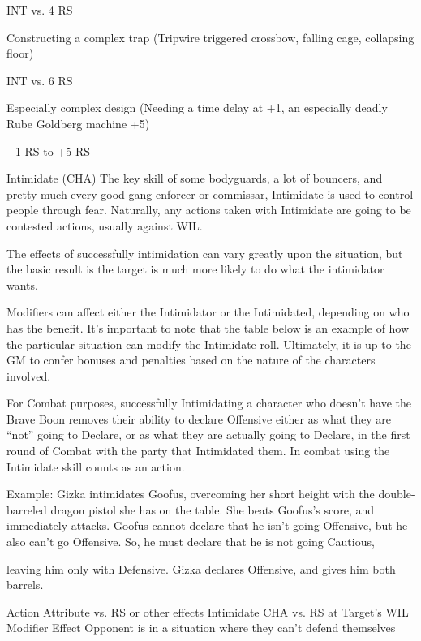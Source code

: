 \documentclass[oneside,11pt,english]{book}
\begin{document}
INT vs. 4 RS 

Constructing a complex trap (Tripwire triggered crossbow, falling cage, 
collapsing floor) 

INT vs. 6 RS 

Especially complex design (Needing a time delay at +1, an especially 
deadly Rube Goldberg machine +5) 

+1 RS to +5 RS 

 

 

Intimidate (CHA) 
The key skill of some bodyguards, a lot of bouncers, and pretty much every good gang enforcer or 
commissar, Intimidate is used to control people through fear. Naturally, any actions taken with Intimidate 
are going to be contested actions, usually against WIL. 

 

The effects of successfully intimidation can vary greatly upon the situation, but the basic result is the 
target is much more likely to do what the intimidator wants. 

 

Modifiers can affect either the Intimidator or the Intimidated, depending on who has the benefit. It’s 
important to note that the table below is an example of how the particular situation can modify the 
Intimidate roll. Ultimately, it is up to the GM to confer bonuses and penalties based on the nature of the 
characters involved. 

 

For Combat purposes, successfully Intimidating a character who doesn’t have the Brave Boon removes 
their ability to declare Offensive either as what they are “not” going to Declare, or as what they are 
actually going to Declare, in the first round of Combat with the party that Intimidated them. In combat 
using the Intimidate skill counts as an action. 

 

Example: Gizka intimidates Goofus, overcoming her short height with the double-barreled dragon pistol 
she has on the table. She beats Goofus’s score, and immediately attacks. Goofus cannot declare that he 
isn’t going Offensive, but he also can’t go Offensive. So, he must declare that he is not going Cautious, 


leaving him only with Defensive. Gizka declares Offensive, and gives him both barrels. 

 

Action Attribute vs. RS or other effects 
Intimidate CHA vs. RS at Target’s WIL 
Modifier Effect 
Opponent is in a situation where they can’t defend 
themselves 
\end{document}
